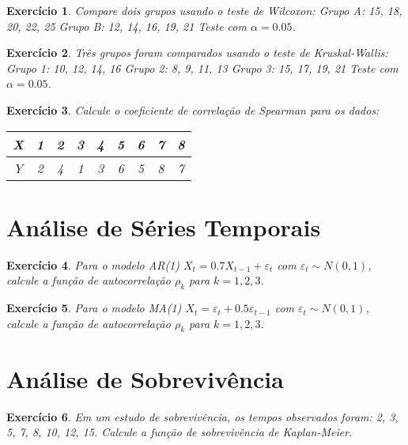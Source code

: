\documentclass[12pt,a4paper]{article}
\newtheorem{exercise}{Exercício}
\begin{document}
\begin{exercise}
Compare dois grupos usando o teste de Wilcoxon:
Grupo A: 15, 18, 20, 22, 25
Grupo B: 12, 14, 16, 19, 21
Teste com $\alpha = 0.05$.
\end{exercise}

\begin{exercise}
Três grupos foram comparados usando o teste de Kruskal-Wallis:
Grupo 1: 10, 12, 14, 16
Grupo 2: 8, 9, 11, 13
Grupo 3: 15, 17, 19, 21
Teste com $\alpha = 0.05$.
\end{exercise}

\begin{exercise}
Calcule o coeficiente de correlação de Spearman para os dados:
\begin{center}
\begin{tabular}{|c|c|c|c|c|c|c|c|c|}
\hline
X & 1 & 2 & 3 & 4 & 5 & 6 & 7 & 8 \\
\hline
Y & 2 & 4 & 1 & 3 & 6 & 5 & 8 & 7 \\
\hline
\end{tabular}
\end{center}
\end{exercise}

\section{Análise de Séries Temporais}

\begin{exercise}
Para o modelo AR(1) $X_t = 0.7X_{t-1} + \varepsilon_t$ com $\varepsilon_t \sim N(0,1)$, calcule a função de autocorrelação $\rho_k$ para $k = 1, 2, 3$.
\end{exercise}

\begin{exercise}
Para o modelo MA(1) $X_t = \varepsilon_t + 0.5\varepsilon_{t-1}$ com $\varepsilon_t \sim N(0,1)$, calcule a função de autocorrelação $\rho_k$ para $k = 1, 2, 3$.
\end{exercise}

\section{Análise de Sobrevivência}

\begin{exercise}
Em um estudo de sobrevivência, os tempos observados foram: 2, 3, 5, 7, 8, 10, 12, 15. Calcule a função de sobrevivência de Kaplan-Meier.
\end{exercise}
\end{document}
